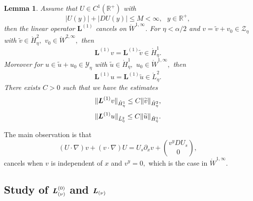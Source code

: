 \documentclass[11pt]{article}
\newtheorem{lemma}[theorem]{Lemma}
\begin{document}
\begin{lemma}
\label{lem: L1} Assume that $U\in C^{1}(\mathbb{R}^{+})$ with 
\begin{equation*}
|U(y)|+|DU(y)|\leq M<\infty ,\text{ \ }y\in \mathbb{R}^{+},
\end{equation*}%
then the linear operator $\boldsymbol{L}^{(1)}$ cancels on $\mathring{W}%
^{1,\infty }$. For $\eta <\alpha /2$ and $v =  \widetilde{v}+v_{0}\in \mathcal{Z}%
_{\eta}$ with $\widetilde{v}\in \mathring{H}_{\eta}^{2},$ $v_{0}\in \mathring{W}%
^{2,\infty },$ then%
\begin{equation*}
\boldsymbol{L}^{(1)}v=\boldsymbol{L}^{(1)}\widetilde{v}\in \mathring{H}%
_{\eta}^{1}.
\end{equation*}%
Moreover for $u\in \widetilde{u}+u_{0}\in \mathcal{Y}_{\eta}$ with $\widetilde{u%
}\in \mathring{H}_{\eta}^{1},$ $u_{0}\in \mathring{W}^{1,\infty },$ then%
\begin{equation*}
\boldsymbol{L}^{(1)}u=\boldsymbol{L}^{(1)}\widetilde{u}\in \mathring{L}%
_{\eta}^{2}.
\end{equation*}%
There exists $C>0$ such that we have the estimates%
\begin{equation*}
\|\boldsymbol{L}^{(1)}v\|_{\mathring{H}_{\eta}^{1}}\leq C\|\widetilde{v}\|_{%
\mathring{H}_{\eta}^{2}},
\end{equation*}%
\begin{equation*}
\|\boldsymbol{L}^{(1)}u\|_{\mathring{L}_{\eta}^{2}}\leq C\|\widetilde{u}\|_{%
\mathring{H}_{\eta}^{1}}.
\end{equation*}
\end{lemma}

The main observation is that
\begin{equation*}
(U\cdot \nabla )v+(v\cdot \nabla )U=U_s\partial _{x}v+\binom{v^{y}DU_s}{0},
\end{equation*}%
cancels when $v$ is independent of $x$ and $v^{y}=0,$ which is the case in $%
\mathring{W}^{1,\infty }.$





\subsection{Study of $\boldsymbol{L}_{(\protect\nu )}^{(0)}$ and $\boldsymbol{%
L}_{(\protect\nu )}$\label{sect: spectra}}


\end{document}
